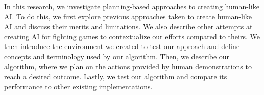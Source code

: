 In this research, we investigate planning-based approaches to creating human-like AI. To do this, we first explore previous approaches taken to create human-like AI and discuss their merits and limitations. We also describe other attempts at creating AI for fighting games to contextualize our efforts compared to theirs. We then introduce the environment we created to test our approach and define concepts and terminology used by our algorithm. Then, we describe our algorithm, where we plan on the actions provided by human demonstrations to reach a desired outcome. Lastly, we test our algorithm and compare its performance to other existing implementations.

